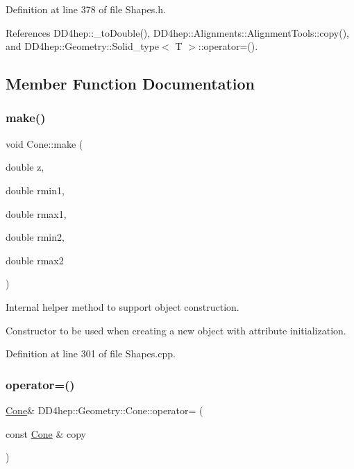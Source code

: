 Definition at line 378 of file Shapes.\+h.



References D\+D4hep\+::\+\_\+to\+Double(), D\+D4hep\+::\+Alignments\+::\+Alignment\+Tools\+::copy(), and D\+D4hep\+::\+Geometry\+::\+Solid\+\_\+type$<$ T $>$\+::operator=().



\subsection{Member Function Documentation}
\hypertarget{class_d_d4hep_1_1_geometry_1_1_cone_ace6de89d73b615ba28493951b83883a0}{}\label{class_d_d4hep_1_1_geometry_1_1_cone_ace6de89d73b615ba28493951b83883a0} 
\subsubsection{\texorpdfstring{make()}{make()}}
{\footnotesize\ttfamily void Cone\+::make (\begin{DoxyParamCaption}\item[{double}]{z,  }\item[{double}]{rmin1,  }\item[{double}]{rmax1,  }\item[{double}]{rmin2,  }\item[{double}]{rmax2 }\end{DoxyParamCaption})\hspace{0.3cm}{\ttfamily [protected]}}



Internal helper method to support object construction. 

Constructor to be used when creating a new object with attribute initialization. 

Definition at line 301 of file Shapes.\+cpp.

\hypertarget{class_d_d4hep_1_1_geometry_1_1_cone_a95c5103992432bf39281ed818b547c97}{}\label{class_d_d4hep_1_1_geometry_1_1_cone_a95c5103992432bf39281ed818b547c97} 
\subsubsection{\texorpdfstring{operator=()}{operator=()}}
{\footnotesize\ttfamily \hyperlink{class_d_d4hep_1_1_geometry_1_1_cone}{Cone}\& D\+D4hep\+::\+Geometry\+::\+Cone\+::operator= (\begin{DoxyParamCaption}\item[{const \hyperlink{class_d_d4hep_1_1_geometry_1_1_cone}{Cone} \&}]{copy }\end{DoxyParamCaption})\hspace{0.3cm}{\ttfamily [default]}}



